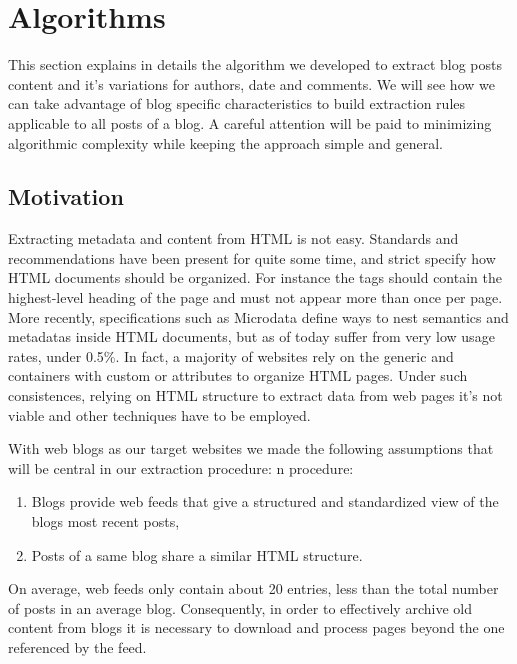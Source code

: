 \section{Algorithms}

This section explains in details the algorithm we developed to extract blog posts content and it's variations for authors, date and comments. We will see how we can take advantage of blog specific characteristics to build extraction rules applicable to all posts of a blog. A careful attention will be paid to minimizing algorithmic complexity while keeping the approach simple and general.


\subsection{Motivation}
Extracting metadata and content from HTML is not easy. Standards and recommendations have been present for quite some time, and strict specify how HTML documents should be organized. For instance the  tags should contain the highest-level heading of the page and must not appear more than once per page\cite{w3c2002}. More recently, specifications such as Microdata\cite{whatwg2013} define ways to nest semantics and metadatas inside HTML documents, but as of today suffer from very low usage rates, under 0.5\%\cite{andrewrogers2013}. In fact, a majority of websites rely on the generic  and  containers with custom  or  attributes to organize HTML pages. Under such consistences, relying on HTML structure to extract data from web pages it's not viable and other techniques have to be employed.


With web blogs as our target websites we made the following assumptions that will be central in our extraction procedure:
n procedure:
\begin{enumerate}[label={(\arabic*)}]
  \item\label{havefeedAssum} Blogs provide web feeds that give a structured and standardized view of the blogs most recent posts,
  \item\label{similarhtmlAssum} Posts of a same blog share a similar HTML structure.
\end{enumerate}
On average, web feeds only contain about 20 entries\cite{oita2010}, less than the total number of posts in an average blog. Consequently, in order to effectively archive old content from blogs it is necessary to download and process pages beyond the one referenced by the feed.


